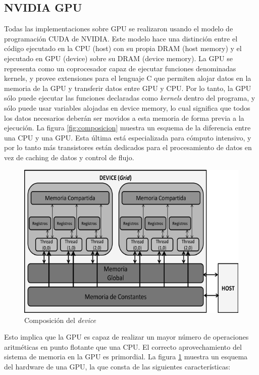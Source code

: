 \subsection{NVIDIA GPU}\label{cap:cuda}

Todas las implementaciones sobre GPU se realizaron usando el modelo de programación CUDA \cite{cuda} de NVIDIA. Este modelo hace una distinción entre el código ejecutado en la CPU (host) con su propia DRAM (host memory) y el ejecutado en GPU (device) sobre su DRAM (device memory). La GPU se representa como un coprocesador capaz de ejecutar funciones denominadas kernels, y provee extensiones para el lenguaje C que permiten alojar datos en la memoria de la GPU y transferir datos entre GPU y CPU. Por lo tanto, la GPU sólo puede ejecutar las funciones declaradas como \textit{kernels} dentro del programa, y sólo puede usar variables alojadas en device memory, lo cual significa que todos los datos necesarios deberán ser movidos a esta memoria de forma previa a la ejecución. La figura \ref{fig:composicion} muestra un esquema de la diferencia entre una CPU y una GPU. Esta última está especializada para cómputo intensivo, y por lo tanto más transistores están dedicados para el procesamiento de datos en vez de caching de datos y control de flujo. 

\begin{figure}
\begin{center}
   \includegraphics[width=12cm]{fig/p.png}
\end{center}
\caption{\label{fig:device}Composición del \textit{device}}
\end{figure}

Esto implica que la GPU es capaz de realizar un mayor número de operaciones aritméticas en punto flotante que una CPU. El correcto aprovechamiento del sistema de memoria en la GPU es primordial. La figura \ref{fig:device} muestra un esquema del hardware de una GPU, la que consta de las siguientes características:

